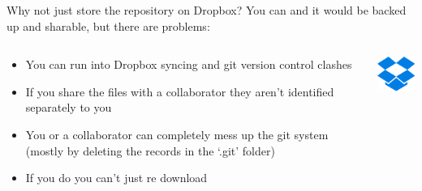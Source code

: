 \documentclass[10pt]{beamer}
\begin{document}
{\begin{frame}[fragile]{Why not just store the repository on Dropbox?}
You can and it would be backed up and sharable, but there are problems:\\
\begin{columns}[T]
\begin{column}{.8\textwidth}
\begin{itemize}
\item You can run into Dropbox syncing and git version control clashes
\item If you share the files with a collaborator they aren't identified separately to you
\item You or a collaborator can completely mess up the git system (mostly by deleting the records in the `.git' folder)
\item If you do you can't just re download
\end{itemize}
\end{column}
\begin{column}{.2\textwidth}
\includegraphics[width=2cm]{Figs/git/Dropbox}
\end{column}
\end{columns}
\end{frame}


}
\end{document}
